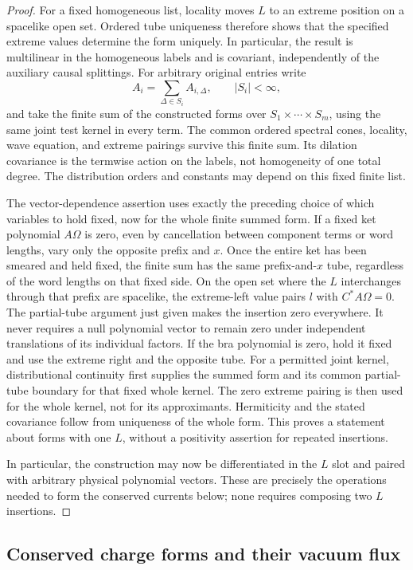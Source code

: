 \begin{proof}
For a fixed homogeneous list, locality moves $L$ to an extreme
position on a spacelike open set.  Ordered tube uniqueness therefore
shows that the specified extreme values determine the form uniquely.
In particular, the result is multilinear in the homogeneous labels
and is covariant, independently of the auxiliary causal splittings.
For arbitrary original entries write
\[
 A_i=\sum_{\Delta\in S_i}A_{i,\Delta},\qquad |S_i|<\infty,
\]
and take the finite sum of the constructed forms over
$S_1\times\cdots\times S_m$, using the same joint test kernel in
every term.  The common ordered spectral cones, locality, wave
equation, and extreme pairings survive this finite sum.  Its dilation
covariance is the termwise action on the labels, not homogeneity of
one total degree.  The distribution orders and constants may depend
on this fixed finite list.

The vector-dependence assertion uses exactly the preceding choice of
which variables to hold fixed, now for the whole finite summed form.
If a fixed ket polynomial $A\Omega$ is zero, even by cancellation
between component terms or word lengths, vary only the opposite
prefix and $x$.  Once the entire ket has been smeared and held fixed,
the finite sum has the same prefix-and-$x$ tube, regardless of the
word lengths on that fixed side.
On the open set where the $L$ interchanges through that prefix
are spacelike, the extreme-left value pairs $l$ with
$C^*A\Omega=0$. The partial-tube argument just given makes
the insertion zero everywhere. It never requires a null
polynomial vector to remain zero under independent translations
of its individual factors. If the bra polynomial is zero,
hold it fixed and use the extreme right and the opposite tube.
For a permitted joint kernel, distributional continuity first
supplies the summed form and its common partial-tube boundary for
that fixed whole kernel.  The zero extreme pairing is then used for
the whole kernel, not for its approximants.  Hermiticity and the
stated covariance follow from uniqueness of the whole form.
This proves
a statement about forms with one $L$, without a positivity
assertion for repeated insertions.

In particular, the construction may now be differentiated in the
$L$ slot and paired with arbitrary physical polynomial vectors.
These are precisely the operations needed to form the conserved
currents below; none requires composing two $L$ insertions.
\end{proof}

\subsection{Conserved charge forms and their vacuum flux}

